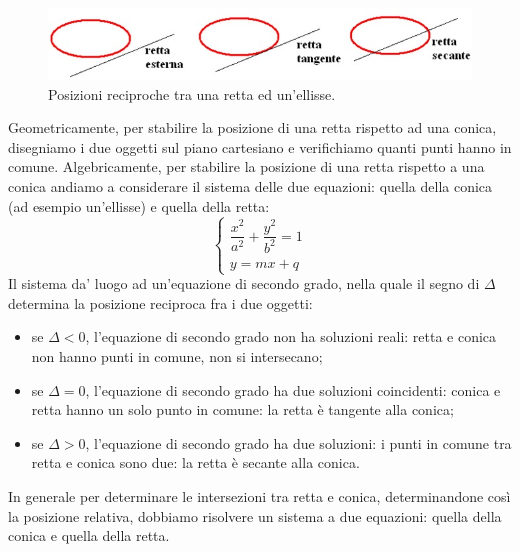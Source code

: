 \begin{figure}[htbp]
  \centering
  \includegraphics[width=\textwidth]{img/rettaconica.jpg}
  \caption{Posizioni reciproche tra una retta ed un'ellisse.}%
\end{figure}
Geometricamente, per stabilire la posizione di una retta rispetto ad una 
conica, disegniamo i due oggetti sul piano cartesiano e verifichiamo quanti 
punti hanno in comune. Algebricamente, per stabilire la posizione di una 
retta rispetto a una conica andiamo a considerare il sistema delle due 
equazioni: quella della conica (ad esempio un'ellisse) e quella della 
retta:
\[\begin{cases}  \dfrac{x^{2}}{a^{2}}+\dfrac{y^{2}}{b^{2}}=1   \\ y=mx+q  
\end{cases}\]
Il sistema da' luogo ad un'equazione di secondo grado, nella quale il 
segno di \(\Delta\) determina la posizione reciproca fra i due oggetti:

\begin{itemize} [noitemsep]
  \item se \(\Delta<0\), l'equazione di secondo grado non ha soluzioni 
reali: retta e conica non hanno punti in comune, non si intersecano;
  \item se \(\Delta=0\), l'equazione di secondo grado ha due soluzioni coincidenti: conica e retta hanno un solo 
punto in comune: la retta è tangente alla conica;
  \item se \(\Delta>0\), l'equazione di secondo grado ha due soluzioni:
  i punti in comune tra retta e conica sono due: la retta è 
secante alla conica.
\end{itemize}

In generale per determinare le intersezioni tra retta e conica, 
determinandone così la posizione relativa, 
dobbiamo risolvere un sistema a due equazioni: quella della conica e quella 
della retta. 

